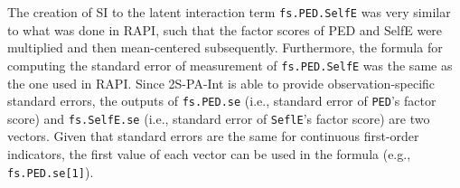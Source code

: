 \documentclass[
  man]{apa7}
\newenvironment{Shaded}{\begin{snugshade}}{\end{snugshade}}
\newcommand{\CommentTok}[1]{\textcolor[rgb]{0.56,0.35,0.01}{\textit{#1}}}
\newcommand{\DecValTok}[1]{\textcolor[rgb]{0.00,0.00,0.81}{#1}}
\newcommand{\FunctionTok}[1]{\textcolor[rgb]{0.13,0.29,0.53}{\textbf{#1}}}
\newcommand{\NormalTok}[1]{#1}
\newcommand{\OtherTok}[1]{\textcolor[rgb]{0.56,0.35,0.01}{#1}}
\newcommand{\SpecialCharTok}[1]{\textcolor[rgb]{0.81,0.36,0.00}{\textbf{#1}}}
\begin{document}
\begin{Shaded}
\end{Shaded}

The creation of SI to the latent interaction term \texttt{fs.PED.SelfE} was very similar to what was done in RAPI, such that the factor scores of PED and SelfE were multiplied and then mean-centered subsequently. Furthermore, the formula for computing the standard error of measurement of \texttt{fs.PED.SelfE} was the same as the one used in RAPI. Since 2S-PA-Int is able to provide observation-specific standard errors, the outputs of \texttt{fs.PED.se} (i.e., standard error of \texttt{PED}'s factor score) and \texttt{fs.SelfE.se} (i.e., standard error of \texttt{SeflE}'s factor score) are two vectors. Given that standard errors are the same for continuous first-order indicators, the first value of each vector can be used in the formula (e.g., \texttt{fs.PED.se{[}1{]}}).
\end{document}
